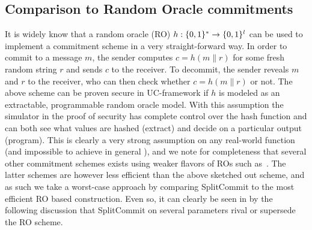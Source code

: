 \subsection{Comparison to Random Oracle commitments}
It is widely know that a random oracle (RO) $h:\{0,1\}^* \to \{0,1\}^l$ can be used to implement a commitment scheme in a very straight-forward way. In order to commit to a message $m$, the sender computes $c = h(m\|r)$ for some fresh random string $r$ and sends $c$ to the receiver. To decommit, the sender reveals $m$ and $r$ to the receiver, who can then check whether $c = h(m\|r)$ or not. The above scheme can be proven secure in UC-framework if $h$ is modeled as an extractable, programmable random oracle model. With this assumption the simulator in the proof of security has complete control over the hash function and can both see what values are hashed (extract) and decide on a particular output (program). This is clearly a very strong assumption on any real-world function (and impossible to achieve in general \cite{DBLP:conf/stoc/CanettiGH98}), and we note for completeness that several other commitment schemes exists using weaker flavors of ROs such as~\cite{DBLP:conf/tcc/HofheinzM04,DBLP:conf/ccs/Canetti0S14}. The latter schemes are however less efficient than the above sketched out scheme, and as such we take a worst-case approach by comparing SplitCommit to the most efficient RO based construction. Even so, it can clearly be seen in by the following discussion that SplitCommit on several parameters rival or supersede the RO scheme.

